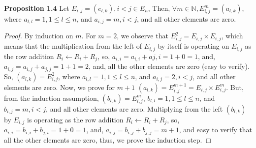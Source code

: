 \documentclass[12pt]{article}
\begin{document}
\textbf{Proposition 1.4} \newline
Let $E_{i,j}=(e_{l,k}),i<j \in E_n$, Then,\newline
$\forall m \in \mathbb{N},E_{i,j}^m=(a_{l,k})$, where $a_{l,l}=1,1 \leq l \leq n$, and $a_{i,j}=m,i<j$, and all other elements are zero.
\begin{proof}
By induction on $m$. \newline
For $m=2$, we observe that $E_{i,j}^2=E_{i,j} \times E_{i,j}$, which means that the multiplication from the left of $E_{i,j}$ by itself is operating on $E_{i,j}$ as the row addition $R_i \leftarrow R_i+R_j$, so, $a_{i,i}=a_{i,i}+a{j,i}=1+0=1$, and, $a_{i,j}=a_{i,j}+a_{j,j}=1+1=2$, and, all the other elements are zero (easy to verify). \newline 
So, $(a_{l,k})=E_{i,j}^2$, where $a_{l,l}=1,1 \leq l \leq n$, and $a_{i,j}=2,i<j$, and all other elements are zero. \newline
Now, we prove for $m+1$ \newline
$(a_{l,k})=E_{i,j}^{m+1}=E_{i,j} \times E_{i,j}^m$. But, from the induction assumption, $(b_{l,k})=E_{i,j}^m$, $b_{l,l}=1,1 \leq l \leq n$, and $b_{i,j}=m,i<j$, and all other elements are zero. \newline
Multiplying from the left $(b_{l,k})$ by $E_{i,j}$ is operating as the row addition $R_i \leftarrow R_i+R_j$, so, $a_{i,i}=b_{i,i}+b_{j,i}=1+0=1$, and, $a_{i,j}=b_{i,j}+b_{j,j}=m+1$, and easy to verify that all the other elements are zero, thus, we prove the induction step. \newline
\end{proof}
\end{document}
